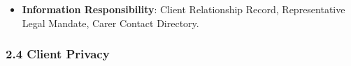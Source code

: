 \begin{itemize}
\begin{itemize}
\begin{itemize}
\item
\emph{Exposed Service}: \texttt{} — Confirms legal decision-making authority for substitute consent.



\end{itemize}


\end{itemize}


\item
\textbf{Information Responsibility}: Client Relationship Record, Representative Legal Mandate, Carer Contact Directory.



\end{itemize}
\label{rad:em:66}

\par\smallskip
{}\label{rad:em:68}
\subsubsection*{2.4 Client Privacy}
\label{rad:em:69}

